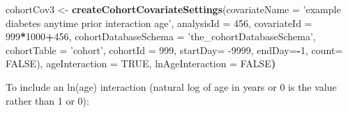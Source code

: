 \documentclass[
]{article}
\newenvironment{Shaded}{\begin{snugshade}}{\end{snugshade}}
\newcommand{\DataTypeTok}[1]{\textcolor[rgb]{0.13,0.29,0.53}{#1}}
\newcommand{\DecValTok}[1]{\textcolor[rgb]{0.00,0.00,0.81}{#1}}
\newcommand{\ErrorTok}[1]{\textcolor[rgb]{0.64,0.00,0.00}{\textbf{#1}}}
\newcommand{\KeywordTok}[1]{\textcolor[rgb]{0.13,0.29,0.53}{\textbf{#1}}}
\newcommand{\NormalTok}[1]{#1}
\newcommand{\OperatorTok}[1]{\textcolor[rgb]{0.81,0.36,0.00}{\textbf{#1}}}
\newcommand{\OtherTok}[1]{\textcolor[rgb]{0.56,0.35,0.01}{#1}}
\newcommand{\StringTok}[1]{\textcolor[rgb]{0.31,0.60,0.02}{#1}}
\begin{document}
\begin{Shaded}
\begin{Highlighting}[]
\NormalTok{cohortCov3 <-}\StringTok{ }\KeywordTok{createCohortCovariateSettings}\NormalTok{(}\DataTypeTok{covariateName =} \StringTok{'example diabetes anytime prior interaction age'}\NormalTok{,}
                                                        \DataTypeTok{analysisId =} \DecValTok{456}\NormalTok{,}
                                                        \DataTypeTok{covariateId =} \DecValTok{999}\OperatorTok{*}\DecValTok{1000}\OperatorTok{+}\DecValTok{456}\NormalTok{,}
                                                      \DataTypeTok{cohortDatabaseSchema =} \StringTok{'the_cohortDatabaseSchema'}\NormalTok{,}
                                                      \DataTypeTok{cohortTable =} \StringTok{'cohort'}\NormalTok{,}
                                                      \DataTypeTok{cohortId =} \DecValTok{999}\NormalTok{,}
                                                      \DataTypeTok{startDay=} \DecValTok{-9999}\NormalTok{, }
                                                      \DataTypeTok{endDay=}\OperatorTok{-}\DecValTok{1}\NormalTok{,}
                                                      \DataTypeTok{count=} \OtherTok{FALSE}\NormalTok{), }
\NormalTok{                                                      ageInteraction =}\StringTok{ }\OtherTok{TRUE}\NormalTok{,}
\NormalTok{                                                      lnAgeInteraction =}\StringTok{ }\OtherTok{FALSE}\ErrorTok{)}
\end{Highlighting}
\end{Shaded}

To include an ln(age) interaction (natural log of age in years or 0 is
the value rather than 1 or 0):
\end{document}
